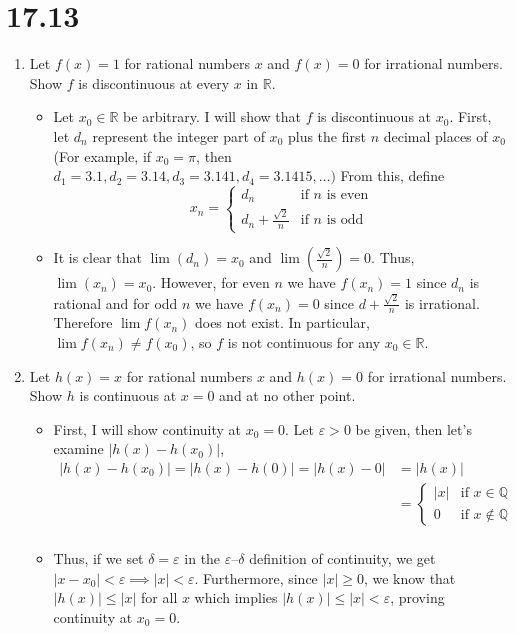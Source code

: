 \documentclass[10pt,a4paper]{article}
\theoremstyle{definition}
\begin{document}
\section*{17.13}
\begin{enumerate}[label = (\alph*)]
\item Let $f(x) = 1$ for rational numbers $x$ and $f(x) = 0$ for irrational numbers. Show $f$ is discontinuous at every $x$ in $\mathbb{R}$.
	\begin{itemize}
	\item Let $x_0 \in \mathbb{R}$ be arbitrary. I will show that $f$ is discontinuous at $x_0$. First, let $d_n$ represent the integer part of $x_0$ plus the first $n$ decimal places of $x_0$ (For example, if $x_0 = \pi$, then $d_1 = 3.1, d_2 = 3.14, d_3 = 3.141, d_4 = 3.1415, \ldots)$ From this, define
	\[x_n = \begin{cases}
		d_n &\text{if $n$ is even}\\
		d_n + \frac{\sqrt{2}}{n} &\text{if $n$ is odd}
	\end{cases}\]
	\item It is clear that $\lim(d_n) = x_0$ and $\lim(\frac{\sqrt{2}}{n}) = 0$. Thus, $\lim(x_n) = x_0$. However, for even $n$ we have $f(x_n) = 1$ since $d_n$ is rational and for odd $n$ we have $f(x_n) = 0$ since $d + \frac{\sqrt{2}}{n}$ is irrational. Therefore $\lim f(x_n)$ does not exist. In particular, $\lim f(x_n) \neq f(x_0)$, so $f$ is not continuous for any $x_0 \in \mathbb{R}$.
	\end{itemize}
\item Let $h(x) = x$ for rational numbers $x$ and $h(x) = 0$ for irrational numbers. Show $h$ is continuous at $x = 0$ and at no other point.
	\begin{itemize}
	\item First, I will show continuity at $x_0 = 0$. Let $\varepsilon > 0$ be given, then let's examine $|h(x) - h(x_0)|$, 
	\begin{align*}
	|h(x) - h(x_0)| = |h(x) - h(0)| = |h(x) - 0| &= |h(x)|\\
	&= \begin{cases}
		|x| &\text{if $x \in \mathbb{Q}$}\\
		0 &\text{if $x \not \in \mathbb{Q}$}
	\end{cases}\\
	\end{align*}
	\item Thus, if we set $\delta = \varepsilon$ in the $\varepsilon$--$\delta$ definition of continuity, we get $|x - x_0| < \varepsilon \implies |x| < \varepsilon$. Furthermore, since $|x| \geq 0$, we know that $|h(x)| \leq |x|$ for all $x$ which implies $|h(x)| \leq |x| < \varepsilon$, proving continuity at $x_0 = 0$.

\end{itemize}
\end{enumerate}
\end{document}
